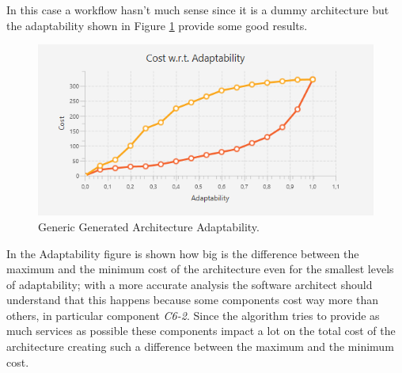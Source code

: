 In this case a workflow hasn't much sense since it is a dummy architecture but the adaptability shown in Figure \ref{fig:generic-adapt} provide some good results.

\begin{figure}[ht]
	\centerline
	{\includegraphics[scale=0.9]{img/generic-adapt.png}}
	\caption[Generic Generated Architecture Adaptability]{Generic Generated Architecture Adaptability.}
	\label{fig:generic-adapt}
\end{figure}
In the Adaptability figure is shown how big is the difference between the maximum and the minimum cost of the architecture even for the smallest levels of adaptability; with a more accurate analysis the software architect should understand that this happens because some components cost way more than others, in particular component \emph{C6-2}. Since the algorithm tries to provide as much services as possible these components impact a lot on the total cost of the architecture creating such a difference between the maximum and the minimum cost. 